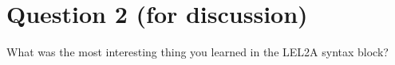 \documentclass{article}
\begin{document}


\section*{Question 2 (for discussion)}

What was the most interesting thing you learned in the LEL2A syntax block?
\end{document}
